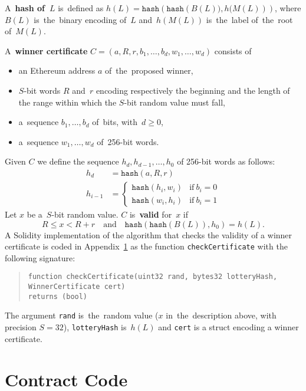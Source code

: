 \documentclass[a4paper]{article}
\newcommand{\hash}[1]{\mathtt{hash}({#1})}
\newcommand{\lotteryhash}[1]{h({#1})}
\begin{document}
    A~\textbf{hash of~$L$} is~defined as $h(L) = \hash{\hash{B(L)), h(M(L)}}$, where $B(L)$ is~the~binary encoding of~$L$
    and~$h(M(L))$ is~the~label of~the~root of~$M(L)$.

    A~\textbf{winner certificate} $C = (a, R, r, b_1, \ldots, b_d, w_1, \ldots, w_d)$ consists of
    \begin{itemize}
    \item an Ethereum address $a$ of~the~proposed winner,
    \item $S$-bit words $R$ and~$r$ encoding respectively the beginning and the length of
      the range within which the $S$-bit random value must fall,
    \item a~sequence $b_1, \ldots, b_d$ of~bits, with~$d \geq 0$,
    \item a~sequence $w_1, \ldots, w_d$ of~256-bit words.
    \end{itemize}
    Given $C$ we define the sequence $h_d, h_{d-1}, \ldots, h_0$ of 256-bit words as follows:
    \begin{align*}
      h_d    &= \hash{a, R, r} \\
      h_{i-1} &= \begin{cases}
        \hash{h_i, w_i} &\text{if}\ b_i = 0\\
        \hash{w_i, h_i} &\text{if}\ b_i = 1
      \end{cases}
    \end{align*}
    Let $x$ be a~$S$-bit random value. $C$ is~\textbf{valid} for~$x$ if
    \begin{displaymath}
      R \leq x < R + r  \quad\text{and}\quad \hash{\hash{B(L)}, h_0} = h(L).
    \end{displaymath}
    A Solidity implementation of the algorithm that checks the validity of a winner certificate is
    coded in Appendix~\ref{sec:code} as the function \verb!checkCertificate! with the following signature:
    \begin{quote}
      \verb|function checkCertificate(uint32 rand, bytes32 lotteryHash, WinnerCertificate cert)|\\
      \verb|returns (bool)|
    \end{quote}
    The argument \verb|rand| is~the~random value ($x$ in~the~description above, with precision $S = 32$),
    \verb|lotteryHash| is~$\lotteryhash{L}$ and \verb|cert| is a struct encoding a winner certificate.

\section{Contract Code}
\label{sec:code}
\end{document}
